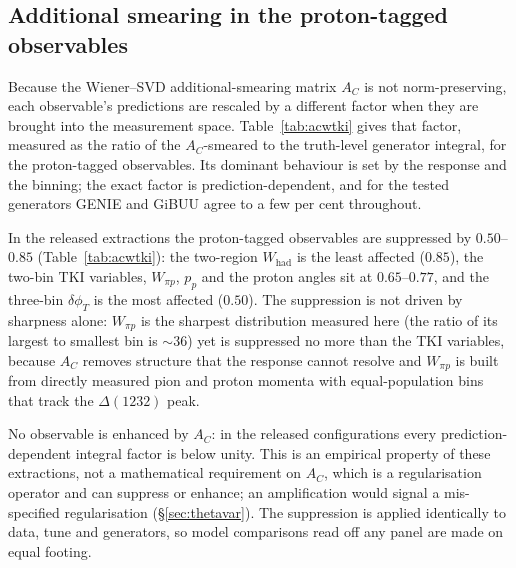 \documentclass[11pt,a4paper]{article}
\begin{document}
\subsection{Additional smearing in the proton-tagged observables}
\label{sec:acwtki}

Because the Wiener--SVD additional-smearing matrix $A_C$ is not norm-preserving, each
observable's predictions are rescaled by a different factor when they are brought into the
measurement space. Table~\ref{tab:acwtki} gives that factor, measured as the ratio of the
$A_C$-smeared to the truth-level generator integral, for the proton-tagged observables.
Its dominant behaviour is set by the response and the binning; the exact factor is
prediction-dependent, and for the tested generators GENIE and GiBUU agree to a few per
cent throughout.

In the released extractions the proton-tagged observables are suppressed by $0.50$--$0.85$
(Table~\ref{tab:acwtki}): the two-region $W_\mathrm{had}$ is the least affected ($0.85$), the
two-bin TKI variables, $W_{\pi p}$, $p_p$ and the proton angles sit at $0.65$--$0.77$, and the
three-bin $\delta\phi_T$ is the most affected ($0.50$). The suppression is not driven by sharpness alone: $W_{\pi p}$ is the sharpest
distribution measured here (the ratio of its largest to smallest bin is $\sim\!36$) yet is
suppressed no more than the TKI variables, because $A_C$ removes structure that the
response cannot resolve and $W_{\pi p}$ is built from directly measured pion and
proton momenta with equal-population bins that track the $\Delta(1232)$ peak.

No observable is enhanced by $A_C$: in the released configurations every
prediction-dependent integral factor is below unity. This is an empirical property of these
extractions, not a mathematical requirement on $A_C$, which is a regularisation operator and
can suppress or enhance; an amplification would signal a mis-specified regularisation
(\S\ref{sec:thetavar}). The suppression is applied identically to data, tune and generators, so model
comparisons read off any panel are made on equal footing.
\end{document}
